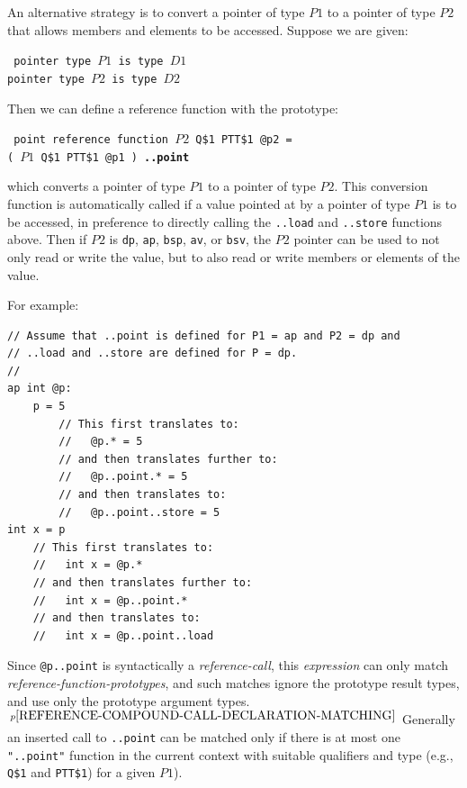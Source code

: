 \documentclass[12pt]{article}
\newcommand{\ttkey}[1]{{\tt \bfseries #1}}
\newcommand{\pagnote}[1]{$\,^{p\pageref{#1}}$}
\newenvironment{indpar}[1][0.3in]%
	{\begin{list}{}%
		     {\setlength{\itemsep}{0in}%
		      \setlength{\topsep}{0in}%
		      \setlength{\parsep}{1ex}%
		      \setlength{\labelwidth}{#1}%
		      \setlength{\leftmargin}{#1}%
		      \addtolength{\leftmargin}{\labelsep}}%
	 \item}%
	{\end{list}}
\begin{document}
An alternative strategy is to convert a pointer of type $P1$
to a pointer of type $P2$ that allows members and elements
to be accessed.  Suppose we are given:
\begin{indpar} \tt
pointer type $P1$ is type $D1$ \\
pointer type $P2$ is type $D2$
\end{indpar}

Then we can define a reference function with the prototype:
\begin{indpar}\label{..POINT} \tt
point reference function $P2$ Q\$1 PTT\$1 @p2 = \\
\hspace*{1in}( $P1$ Q\$1 PTT\$1 @p1 ) \ttkey{..point}
\end{indpar}
which converts a pointer of type $P1$ to a pointer of type $P2$.
This conversion function is automatically called
if a value pointed at by a pointer of type $P1$ is to
be accessed, in preference to directly calling
the {\tt ..load} and {\tt ..store} functions above.
Then if $P2$ is {\tt dp}, {\tt ap}, {\tt bsp}, {\tt av},
or {\tt bsv}, the $P2$ pointer can be used to not only read or write
the value, but to also read or write members or elements of the
value.

For example:
\begin{indpar}\begin{verbatim}
// Assume that ..point is defined for P1 = ap and P2 = dp and
// ..load and ..store are defined for P = dp.
//
ap int @p:
    p = 5
        // This first translates to:
        //   @p.* = 5
        // and then translates further to:
        //   @p..point.* = 5
        // and then translates to:
        //   @p..point..store = 5
int x = p
    // This first translates to:
    //   int x = @p.*
    // and then translates further to:
    //   int x = @p..point.*
    // and then translates to:
    //   int x = @p..point..load
\end{verbatim}\end{indpar}

Since {\tt @p..point} is syntactically a {\em reference-call},
this {\em expression}
can only match {\em reference-function-prototypes}, and such matches
ignore the prototype result types, and use only the prototype
argument types.\pagnote{REFERENCE-COMPOUND-CALL-DECLARATION-MATCHING}
Generally an inserted call to {\tt ..point} can be matched only if there
is at most one {\tt "..point"} function in the current context
with suitable qualifiers and type (e.g., {\tt Q\$1} and {\tt PTT\$1})
for a given $P1$).
\end{document}

